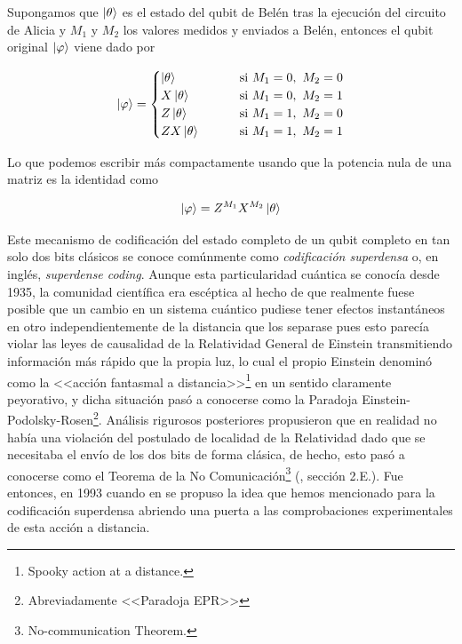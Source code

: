 \documentclass[11pt, spanish]{report}
\numberwithin{equation}{section}
\numberwithin{defin}{section}
\begin{document}
\begin{appendices}

Supongamos que $\ket{\theta}$ es el estado del qubit de Belén tras la ejecución del circuito de Alicia y $M_1$ y $M_2$ los valores medidos y enviados a Belén, entonces el qubit original $\ket{\varphi}$ viene dado por

\begin{equation}
\ket{\varphi}=\begin{cases}
\ket{\theta}\qquad  &\text{ si } M_1=0,\ M_2=0 \\
X\ket{\theta}\qquad  &\text{ si } M_1=0,\ M_2=1 \\
Z\ket{\theta}\qquad  &\text{ si } M_1=1,\ M_2=0 \\
ZX\ket{\theta}\qquad  &\text{ si } M_1=1,\ M_2=1
\end{cases}
\end{equation}

Lo que podemos escribir más compactamente usando que la potencia nula de una matriz es la identidad como

\begin{equation}
\ket{\varphi}=Z^{M_1}X^{M_2}\ket{\theta}
\end{equation}

Este mecanismo de codificación del estado completo de un qubit completo en tan solo dos bits clásicos se conoce comúnmente como \emph{codificación superdensa} o, en inglés, \emph{superdense coding}. Aunque esta particularidad cuántica se conocía desde 1935, la comunidad científica era escéptica al hecho de que realmente fuese posible que un cambio en un sistema cuántico pudiese tener efectos instantáneos en otro independientemente de la distancia que los separase pues esto parecía violar las leyes de causalidad de la Relatividad General de Einstein transmitiendo información más rápido que la propia luz, lo cual el propio Einstein denominó como la <<acción fantasmal a distancia>>\footnote{Spooky action at a distance.} en un sentido claramente peyorativo, y dicha situación pasó a conocerse como la Paradoja Einstein-Podolsky-Rosen\footnote{Abreviadamente <<Paradoja EPR>>}. Análisis rigurosos posteriores propusieron que en realidad no había una violación del postulado de localidad de la Relatividad dado que se necesitaba el envío de los dos bits de forma clásica, de hecho, esto pasó a conocerse como el Teorema de la No Comunicación\footnote{No-communication Theorem. } (\cite{Peres:2002wx}, sección 2.E.). Fue entonces, en 1993 cuando en \cite{Bennett93teleportingan} se propuso la idea que hemos mencionado para la codificación superdensa abriendo una puerta a las comprobaciones experimentales de esta acción a distancia.\\


\end{appendices}
\end{document}
